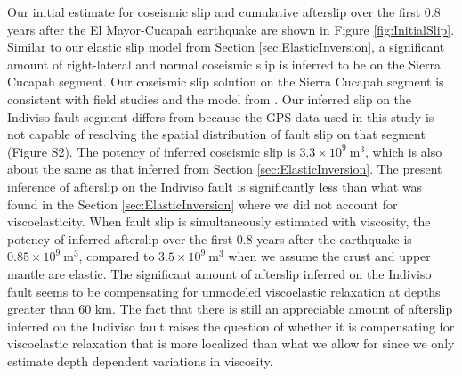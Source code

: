 \documentclass[draft,linenumbers]{AGUJournal}
\begin{document}
Our initial estimate for coseismic slip and cumulative afterslip over the first 0.8 years after the El Mayor-Cucapah earthquake are shown in Figure \ref{fig:InitialSlip}.  Similar to our elastic slip model from Section \ref{sec:ElasticInversion}, a significant amount of right-lateral and normal coseismic slip is inferred to be on the Sierra Cucapah segment. Our coseismic slip solution on the Sierra Cucapah segment is consistent with field studies \citep{Fletcher2014} and the model from \citet{Wei2011}.  Our inferred slip on the Indiviso fault segment differs from \citet{Wei2011} because the GPS data used in this study is not capable of resolving the spatial distribution of fault slip on that segment (Figure S2).  The potency of inferred coseismic slip is $3.3\times 10^{9}\ \mathrm{m}^3$, which is also about the same as that inferred from Section \ref{sec:ElasticInversion}. The present inference of afterslip on the Indiviso fault is significantly less than what was found in the Section \ref{sec:ElasticInversion} where we did not account for viscoelasticity. When fault slip is simultaneously estimated with viscosity, the potency of inferred afterslip over the first 0.8 years after the earthquake is $0.85\times 10^9\ \mathrm{m}^3$, compared to $3.5\times10^{9}\ \mathrm{m}^3$ when we assume the crust and upper mantle are elastic.  The significant amount of afterslip inferred on the Indiviso fault seems to be compensating for unmodeled viscoelastic relaxation at depths greater than $60$ km.  The fact that there is still an appreciable amount of afterslip inferred on the Indiviso fault raises the question of whether it is compensating for viscoelastic relaxation that is more localized than what we allow for since we only estimate depth dependent variations in viscosity.
\end{document}
